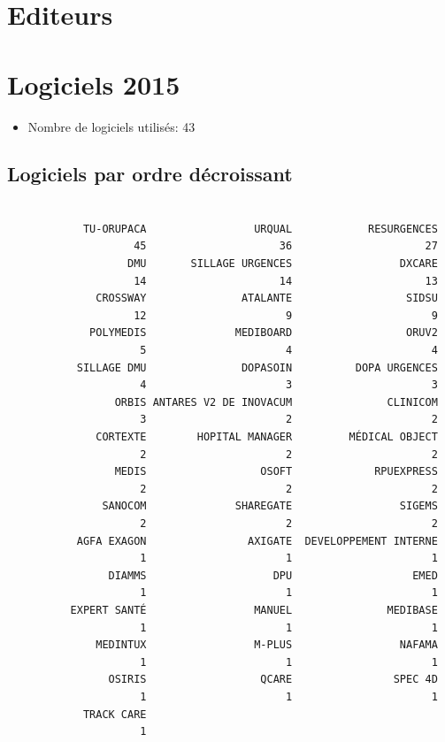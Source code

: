 \documentclass[]{article}
\begin{document}
\section{Editeurs}\label{editeurs}

\section{Logiciels 2015}\label{logiciels-2015}

\begin{itemize}
\itemsep1pt\parskip0pt
\item
  Nombre de logiciels utilisés: 43
\end{itemize}

\subsection{Logiciels par ordre
décroissant}\label{logiciels-par-ordre-decroissant}

\begin{verbatim}

            TU-ORUPACA                 URQUAL            RESURGENCES 
                    45                     36                     27 
                   DMU       SILLAGE URGENCES                 DXCARE 
                    14                     14                     13 
              CROSSWAY               ATALANTE                  SIDSU 
                    12                      9                      9 
             POLYMEDIS              MEDIBOARD                  ORUV2 
                     5                      4                      4 
           SILLAGE DMU               DOPASOIN          DOPA URGENCES 
                     4                      3                      3 
                 ORBIS ANTARES V2 DE INOVACUM               CLINICOM 
                     3                      2                      2 
              CORTEXTE        HOPITAL MANAGER         MÉDICAL OBJECT 
                     2                      2                      2 
                 MEDIS                  OSOFT             RPUEXPRESS 
                     2                      2                      2 
               SANOCOM              SHAREGATE                 SIGEMS 
                     2                      2                      2 
           AGFA EXAGON                AXIGATE  DEVELOPPEMENT INTERNE 
                     1                      1                      1 
                DIAMMS                    DPU                   EMED 
                     1                      1                      1 
          EXPERT SANTÉ                 MANUEL               MEDIBASE 
                     1                      1                      1 
              MEDINTUX                 M-PLUS                 NAFAMA 
                     1                      1                      1 
                OSIRIS                  QCARE                SPEC 4D 
                     1                      1                      1 
            TRACK CARE 
                     1 
\end{verbatim}
\end{document}
